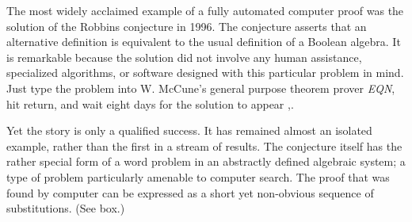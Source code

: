 \documentclass{llncs}
\begin{document}
The most widely acclaimed example of a fully automated computer proof
was the solution of the Robbins conjecture in 1996.  
The conjecture asserts that an alternative definition is equivalent
to the usual definition of a Boolean algebra.
It is remarkable
because the solution did not involve any human assistance,
specialized algorithms, or software
designed with this particular problem in mind.
Just type the problem into W. McCune's general purpose
theorem prover {\it EQN}, hit return, and wait
eight days for the solution to appear  \cite{Mc1},\cite{Mc2}.

Yet the story is only a qualified success.  It has
remained almost an isolated example, rather than the first in a stream
of results.  The conjecture itself has the rather special form of a
word problem in an
abstractly defined algebraic system; a type of
problem particularly amenable to computer search.
The proof that was found by
computer can be expressed as a short yet non-obvious sequence
of substitutions. (See box.)
\end{document}
